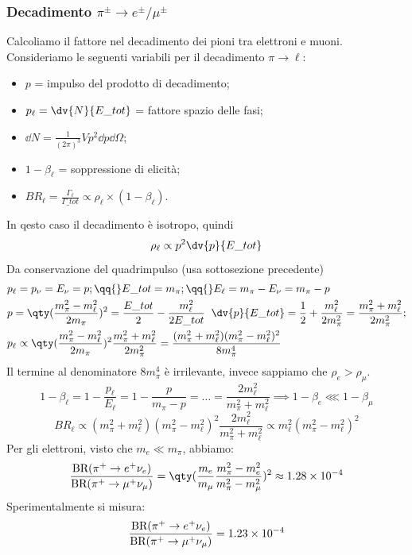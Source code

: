 \subsubsection{Decadimento $\pi^\pm\to e^\pm/\mu^\pm$}
Calcoliamo il fattore nel decadimento dei pioni tra elettroni e muoni.\\
Consideriamo le seguenti variabili per il decadimento $\pi\to\ell$:
\begin{itemize}
    \item $p$ = impulso del prodotto di decadimento;
    \item $p_\ell=\dv{N}{E\_{tot}}$ = fattore spazio delle fasi;
    \item $\dd{N}=\frac{1}{(2\pi)^3}Vp^2\dd{p}\dd{\Omega}$;
    \item $1-\beta_\ell$ = soppressione di elicità;
    \item $BR_\ell = \frac{\Gamma_\ell}{\Gamma\_{tot}} \propto \rho_\ell\times(1-\beta_\ell)$.
\end{itemize}
In qesto caso il decadimento è isotropo, quindi
\begin{equation*}
    \rho_\ell \propto p^2\dv{p}{E\_{tot}}
\end{equation*}
Da conservazione del quadrimpulso (usa sottosezione precedente)
\begin{align*}
&p_\ell=p_\nu=E_\nu=p;\qq{}E\_{tot}=m_\pi;\qq{}E_\ell=m_\pi-E_\nu=m_\pi-p\\
&p=\qty(\frac{m_\pi^2-m_\ell^2}{2m_\pi})^2=\frac{E\_{tot}}{2}-\frac{m_\ell^2}{2E\_{tot}}\;\;\dv{p}{E\_{tot}}=\frac{1}{2}+\frac{m_\ell^2}{2m_\pi^2}=\frac{m_\pi^2+m_\ell^2}{2m_\pi^2};\\
&p_\ell\propto\qty(\frac{m_\pi^2-m_\ell^2}{2m_\pi})^2\frac{m_\pi^2+m_\ell^2}{2m_\pi^2}=\frac{(m_\pi^2+m_\ell^2)(m_\pi^2-m_\ell^2)^2}{8m_\pi^4}
\end{align*}
Il termine al denominatore $8m_\pi^4$ è irrilevante, invece sappiamo che $\rho_e>\rho_\mu$.\\
\begin{equation*}
1-\beta_\ell=1-\frac{p_\ell}{E_\ell}=1-\frac{p}{m_\pi-p}=\dots=\frac{2m_\ell^2}{m_\pi^2+m_\ell^2}\implies 1-\beta_e\lll1-\beta_\mu
\end{equation*}
\begin{equation*}
    BR_\ell\propto(m_\pi^2+m_\ell^2)(m_\pi^2-m_\ell^2)^2\frac{2m_\ell^2}{m_\pi^2+m_\ell^2}\propto m_\ell^2(m_\pi^2-m_\ell^2)^2
\end{equation*}
Per gli elettroni, visto che $m_e\ll m_\pi$, abbiamo:
\begin{equation*}
    \frac{\textnormal{BR}(\pi^+\to e^+\nu_e)}{\textnormal{BR}(\pi^+\to \mu^+\nu_\mu)}=\qty(\frac{m_e}{m_\mu}\frac{m_\pi^2-m_e^2}{m_\pi^2-m_\mu^2})^2\approx1.28\times10^{-4}
\end{equation*}
Sperimentalmente si misura:
\begin{equation*}
    \frac{\textnormal{BR}(\pi^+\to e^+\nu_e)}{\textnormal{BR}(\pi^+\to \mu^+\nu_\mu)}=1.23\times10^{-4}
\end{equation*}